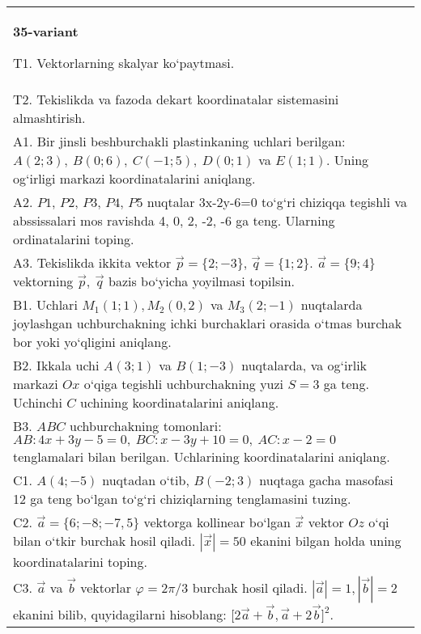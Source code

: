 \documentclass{article}
\begin{document}
\begin{tabular}{m{17cm}}
\textbf{35-variant}

T1. 
Vektorlarning skalyar ko‘paytmasi.
 \\
T2. 
Tekislikda va fazoda dekart koordinatalar sistemasini almashtirish.
 \\
A1. 
Bir jinsli beshburchakli plastinkaning uchlari berilgan:
$A (2;3), \ B (0;6), \ C (-1;5), \ D (0;1) $ va $E (1;1) $. Uning og‘irligi
markazi koordinatalarini aniqlang.
 \\
A2. 
$P1$, $P2$, $P3$, $P4$, $P5$ nuqtalar
3x-2y-6=0 to‘g‘ri chiziqqa tegishli va abssissalari mos ravishda
4, 0, 2, -2, -6 ga teng. Ularning ordinatalarini toping.
 \\
A3. 
Tekislikda ikkita vektor
$\overrightarrow{p} = \{ 2; - 3\}$, $\overrightarrow{q} = \{ 1;2\}$.
$\overrightarrow{a} = \{9;4\}$ vektorning
$\overrightarrow{p},\ \overrightarrow{q}$ bazis bo‘yicha yoyilmasi topilsin.
 \\
B1. 
Uchlari \(M_{1} (1;1), M_{2} (0,2) \) va
\(M_{3} (2;-1) \) nuqtalarda joylashgan uchburchakning ichki 
burchaklari orasida o‘tmas burchak bor yoki yo‘qligini aniqlang.
 \\
B2. 
Ikkala uchi \(A (3;1) \) va \(B (1;-3) \) nuqtalarda, va
og‘irlik markazi $Ox$ o‘qiga tegishli uchburchakning yuzi
\(S=3\) ga teng. Uchinchi $C$ uchining koordinatalarini aniqlang.
 \\
B3. 
$ABC$ uchburchakning tomonlari:
\(AB:4x+3y-5=0,\ BC:x-3y+10=0,\ AC:x-2=0\) 
tenglamalari bilan berilgan. Uchlarining koordinatalarini aniqlang.
 \\
C1. 
\(A (4;-5) \) nuqtadan o‘tib, \(B (-2;3) \) nuqtaga
gacha masofasi 12 ga teng bo‘lgan to‘g‘ri chiziqlarning tenglamasini tuzing.
 \\
C2. 
$\vec{a} = \{ 6; - 8; - 7,5\}$ vektorga kollinear bo‘lgan $\vec{x}$ vektor $Oz$ o‘qi bilan o‘tkir burchak hosil qiladi. $|\vec{x}| = 50$ ekanini bilgan holda uning koordinatalarini toping.
 \\
C3. 
$\vec{a}$ va $\vec{b}$ vektorlar $\varphi = 2\pi/3$ burchak hosil qiladi. $|\vec{a}| = 1,|\vec{b}| = 2$ ekanini bilib, quyidagilarni hisoblang:
$\lbrack 2\overrightarrow{a} + \overrightarrow{b},\overrightarrow{a} + 2\overrightarrow{b}\rbrack^{2}$.
 \\

\end{tabular}
\vspace{1cm}
\end{document}
